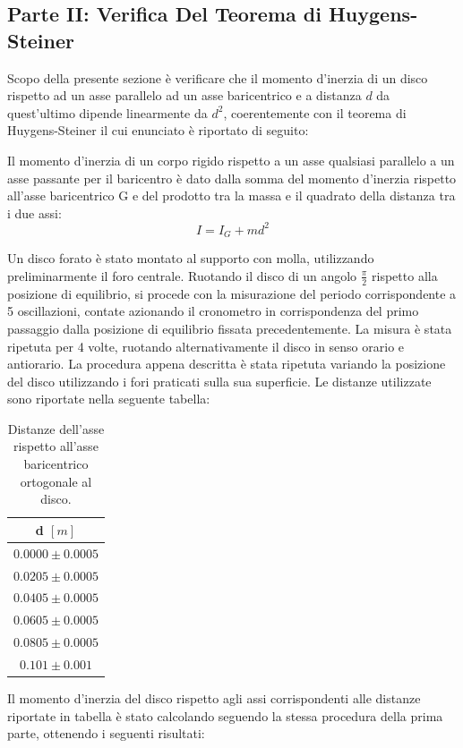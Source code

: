\subsection{Parte II: Verifica Del Teorema di Huygens-Steiner}
Scopo della presente sezione è verificare che il momento d'inerzia di un disco rispetto ad un asse parallelo ad un asse baricentrico e a distanza $d$ da quest'ultimo dipende linearmente da $d^2$, coerentemente con il teorema di Huygens-Steiner il cui enunciato è riportato di seguito:

\begin{teorema}
Il momento d’inerzia di un corpo rigido rispetto a un asse qualsiasi parallelo a un asse passante per il baricentro è dato dalla somma del momento d’inerzia rispetto all’asse baricentrico G e del prodotto tra la massa e il quadrato della distanza tra i due assi: 
\[
I = I_G + m d^2
\]
\end{teorema}

Un disco forato è stato montato al supporto con molla, utilizzando preliminarmente il foro centrale. Ruotando il disco di un angolo $\frac{\pi}{2}$ rispetto alla posizione di equilibrio, si procede con la misurazione del periodo corrispondente a 5 oscillazioni, contate azionando il cronometro in corrispondenza del primo passaggio dalla posizione di equilibrio fissata precedentemente. La misura è stata ripetuta per 4 volte, ruotando alternativamente il disco in senso orario e antiorario. La procedura appena descritta è stata ripetuta variando la posizione del disco utilizzando i fori praticati sulla sua superficie. Le distanze utilizzate sono riportate nella seguente tabella:

\begin{table}[H]
	\centering
	\begin{tabular}{|c|}
		\hline
		\textbf{d $[m]$} \\
		\hline
		$0.0000\pm 0.0005$ \\
		$0.0205\pm 0.0005$ \\
		$0.0405\pm 0.0005$ \\
		$0.0605\pm 0.0005$ \\
		$0.0805\pm 0.0005$ \\
            $0.101 \pm 0.001$ \\
		\hline
	\end{tabular}
	\caption{Distanze dell'asse rispetto all'asse baricentrico ortogonale al disco.}
	\label{tab:}
\end{table}

Il momento d'inerzia del disco rispetto agli assi corrispondenti alle distanze riportate in tabella è stato calcolando seguendo la stessa procedura della prima parte, ottenendo i seguenti risultati:

